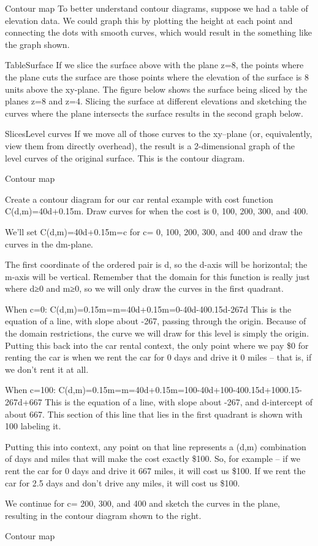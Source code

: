 Contour map
To better understand contour diagrams, suppose we had a table of elevation data. We could graph this by plotting the height at each point and connecting the dots with smooth curves, which would result in the something like the graph shown.

TableSurface
If we slice the surface above with the plane z=8, the points where the plane cuts the surface are those points where the elevation of the surface is 8 units above the xy-plane. The figure below shows the surface being sliced by the planes z=8 and z=4. Slicing the surface at different elevations and sketching the curves where the plane intersects the surface results in the second graph below.

SlicesLevel curves
If we move all of those curves to the xy–plane (or, equivalently, view them from directly overhead), the result is a 2-dimensional graph of the level curves of the original surface. This is the contour diagram.

Contour map
\begin{example}
Create a contour diagram for our car rental example with cost function C(d,m)=40d+0.15m. Draw curves for when the cost is 0, 100, 200, 300, and 400.

\begin{solution}
  We'll set C(d,m)=40d+0.15m=c for c= 0, 100, 200, 300, and 400 and draw the curves in the dm-plane.

The first coordinate of the ordered pair is d, so the d-axis will be horizontal; the m-axis will be vertical. Remember that the domain for this function is really just where d≥0 and m≥0, so we will only draw the curves in the first quadrant.

When c=0:
C(d,m)=0.15m=m=40d+0.15m=0-40d-400.15d\approx   -267d
This is the equation of a line, with slope about -267, passing through the origin. Because of the domain restrictions, the curve we will draw for this level is simply the origin. Putting this back into the car rental context, the only point where we pay \$0 for renting the car is when we rent the car for 0 days and drive it 0 miles – that is, if we don't rent it at all.

When c=100:
C(d,m)=0.15m=m=40d+0.15m=100-40d+100-400.15d+1000.15\approx   -267d+667
This is the equation of a line, with slope about -267, and d-intercept of about 667. This section of this line that lies in the first quadrant is shown with 100 labeling it.

Putting this into context, any point on that line represents a (d,m) combination of days and miles that will make the cost exactly \$100. So, for example – if we rent the car for 0 days and drive it 667 miles, it will cost us \$100. If we rent the car for 2.5 days and don't drive any miles, it will cost us \$100.

We continue for c= 200, 300, and 400 and sketch the curves in the plane, resulting in the contour diagram shown to the right.

Contour map
\end{solution}\end{example}

